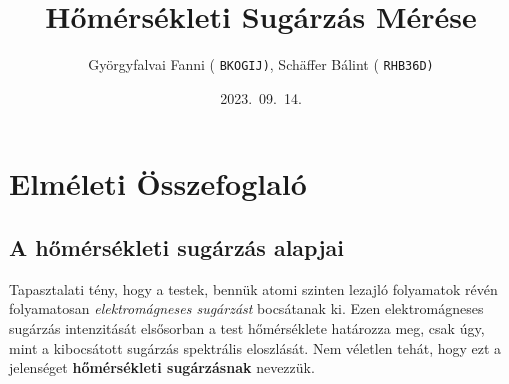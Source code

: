 \documentclass[a4paper, 12pt]{article}
\title{\textbf{Hőmérsékleti Sugárzás Mérése}}
\author{Györgyfalvai Fanni ( \texttt{BKOGIJ)}, Schäffer Bálint ( \texttt{RHB36D)}
}
\date{2023.\ 09.\ 14.}
\begin{document}
    \maketitle
    \tableofcontents
    \newpage

    \section{Elméleti Összefoglaló}\label{sec:elmeleti-osszefoglalo}
    \subsection{A hőmérsékleti sugárzás alapjai}\label{subsec:a-homersekleti-sugarzas-alapjai}
    Tapasztalati tény, hogy a testek, bennük atomi szinten lezajló folyamatok révén folyamatosan \textit{elektromágneses sugárzást} bocsátanak ki.
    Ezen elektromágneses sugárzás intenzitását elsősorban a test hőmérséklete határozza meg, csak úgy, mint a kibocsátott sugárzás spektrális eloszlását.
    Nem véletlen tehát, hogy ezt a jelenséget \textbf{hőmérsékleti sugárzásnak} nevezzük.
\end{document}
